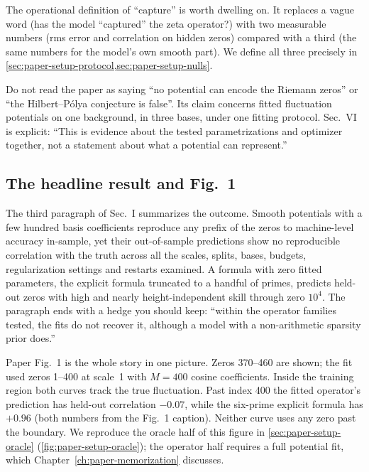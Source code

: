The operational definition of ``capture'' is worth dwelling on. It replaces a vague word (has the model ``captured'' the zeta operator?) with two measurable numbers (rms error and correlation on hidden zeros) compared with a third (the same numbers for the model's own smooth part). We define all three precisely in \cref{sec:paper-setup-protocol,sec:paper-setup-nulls}.

\begin{pitfall}
Do not read the paper as saying ``no potential can encode the Riemann zeros'' or ``the Hilbert--P\'olya conjecture is false''. Its claim concerns fitted fluctuation potentials on one background, in three bases, under one fitting protocol. Sec.~VI is explicit: ``This is evidence about the tested parametrizations and optimizer together, not a statement about what a potential can represent.''
\end{pitfall}

\subsection{The headline result and Fig.~1}

The third paragraph of Sec.~I summarizes the outcome. Smooth potentials with a few hundred basis coefficients reproduce any prefix of the zeros to machine-level accuracy in-sample, yet their out-of-sample predictions show no reproducible correlation with the truth across all the scales, splits, bases, budgets, regularization settings and restarts examined. A formula with zero fitted parameters, the explicit formula truncated to a handful of primes, predicts held-out zeros with high and nearly height-independent skill through zero $10^4$. The paragraph ends with a hedge you should keep: ``within the operator families tested, the fits do not recover it, although a model with a non-arithmetic sparsity prior does.''

Paper Fig.~1 is the whole story in one picture. Zeros 370--460 are shown; the fit used zeros 1--400 at scale~1 with $M=400$ cosine coefficients. Inside the training region both curves track the true fluctuation. Past index 400 the fitted operator's prediction has held-out correlation $-0.07$, while the six-prime explicit formula has $+0.96$ (both numbers from the Fig.~1 caption). Neither curve uses any zero past the boundary. We reproduce the oracle half of this figure in \cref{sec:paper-setup-oracle} (\cref{fig:paper-setup-oracle}); the operator half requires a full potential fit, which Chapter~\ref{ch:paper-memorization} discusses.

